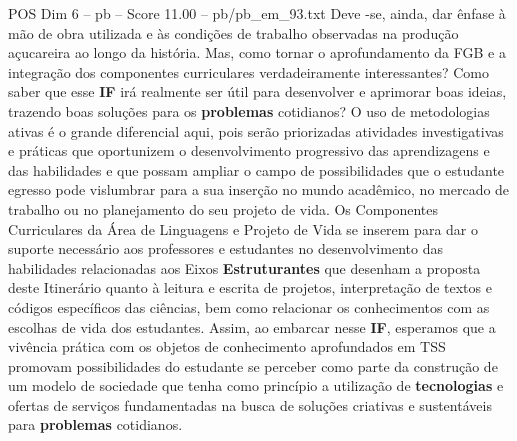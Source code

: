 \begin{textsample}{POS Dim 6 – pb – Score 11.00 – pb/pb\_em\_93.txt}
Deve -se, ainda, dar ênfase à mão de obra utilizada e às condições de trabalho observadas na produção açucareira ao longo da história.
Mas, como tornar o aprofundamento da FGB e a integração dos componentes curriculares verdadeiramente interessantes?
Como saber que esse \textbf{IF} irá realmente ser útil para desenvolver e aprimorar boas ideias, trazendo boas soluções para os \textbf{problemas} cotidianos?
O uso de metodologias ativas é o grande diferencial aqui, pois serão priorizadas atividades investigativas e práticas que oportunizem o desenvolvimento progressivo das aprendizagens e das habilidades e que possam ampliar o campo de possibilidades que o estudante egresso pode vislumbrar para a sua inserção no mundo acadêmico, no mercado de trabalho ou no planejamento do seu projeto de vida.
Os Componentes Curriculares da Área de Linguagens e Projeto de Vida se inserem para dar o suporte necessário aos professores e estudantes no desenvolvimento das habilidades relacionadas aos Eixos \textbf{Estruturantes} que desenham a proposta deste Itinerário quanto à leitura e escrita de projetos, interpretação de textos e códigos específicos das ciências, bem como relacionar os conhecimentos com as escolhas de vida dos estudantes.
Assim, ao embarcar nesse \textbf{IF}, esperamos que a vivência prática com os objetos de conhecimento aprofundados em TSS promovam possibilidades do estudante se perceber como parte da construção de um modelo de sociedade que tenha como princípio a utilização de \textbf{tecnologias} e ofertas de serviços fundamentadas na busca de soluções criativas e sustentáveis para \textbf{problemas} cotidianos.

\end{textsample}
